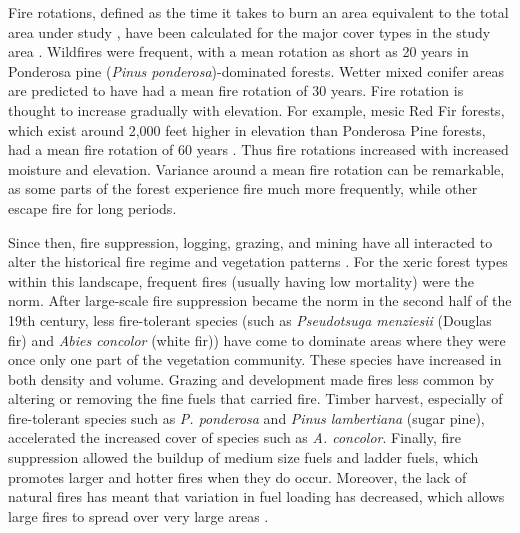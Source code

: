 Fire rotations, defined as the time it takes to burn an area equivalent to the total area under study \citep{Agee1993}, have been calculated for the major cover types in the study area \citep{Mallek2013}. Wildfires were frequent, with a mean rotation as short as 20 years in Ponderosa pine (\emph{Pinus ponderosa})-dominated forests. Wetter mixed conifer areas are predicted to have had a mean fire rotation of 30 years. Fire rotation is thought to increase gradually with elevation. For example, mesic Red Fir forests, which exist around 2,000 feet higher in elevation than Ponderosa Pine forests, had a mean fire rotation of 60 years \citep{Mallek2013}. Thus fire rotations increased with increased moisture and elevation. Variance around a mean fire rotation can be remarkable, as some parts of the forest experience fire much more frequently, while other escape fire for long periods. 

Since then, fire suppression, logging, grazing, and mining have all interacted to alter the historical fire regime and vegetation patterns \citep{Stephens2015,Knapp2013}. For the xeric forest types within this landscape, frequent fires (usually having low mortality) were the norm. After large-scale fire suppression became the norm in the second half of the 19th century, less fire-tolerant species (such as \emph{Pseudotsuga menziesii} (Douglas fir) and \emph{Abies concolor} (white fir)) have come to dominate areas where they were once only one part of the vegetation community. These species have increased in both density and volume.  Grazing and development made fires less common by altering or removing the fine fuels that carried fire. Timber harvest, especially of fire-tolerant species such as \emph{P. ponderosa} and \emph{Pinus lambertiana} (sugar pine), accelerated the increased cover of species such as \emph{A. concolor}. Finally, fire suppression allowed the buildup of medium size fuels and ladder fuels, which promotes larger and hotter fires when they do occur. Moreover, the lack of natural fires has meant that variation in fuel loading has decreased, which allows large fires to spread over very large areas \citep{Hessburg2005,Beaty2007,Meyer2008}.





